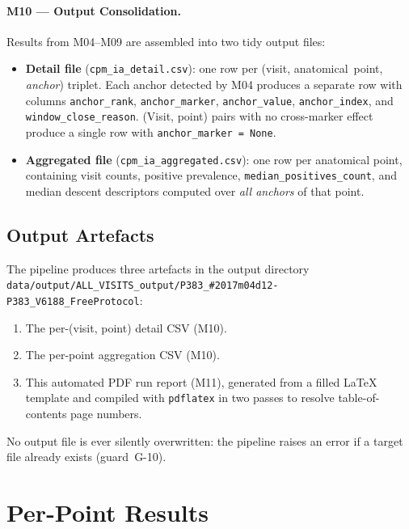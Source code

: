 \documentclass[a4paper,11pt]{article}
\begin{document}
\paragraph{M10 --- Output Consolidation.}
Results from M04--M09 are assembled into two tidy output files:
\begin{itemize}
  \item \textbf{Detail file} (\texttt{cpm\_ia\_detail.csv}): one row per
        (visit, anatomical~point, \emph{anchor}) triplet. Each anchor detected by M04
        produces a separate row with columns \texttt{anchor\_rank},
        \texttt{anchor\_marker}, \texttt{anchor\_value}, \texttt{anchor\_index},
        and \texttt{window\_close\_reason}.
        (Visit, point) pairs with no cross-marker effect produce a single row with
        \texttt{anchor\_marker = None}.
  \item \textbf{Aggregated file} (\texttt{cpm\_ia\_aggregated.csv}): one row per
        anatomical point, containing visit counts, positive prevalence,
        \texttt{median\_positives\_count}, and median descent descriptors computed over
        \emph{all anchors} of that point.
\end{itemize}

\subsection{Output Artefacts}

The pipeline produces three artefacts in the output directory \texttt{data/output/ALL\_VISITS\_output/P383\_\#2017m04d12-P383\_V6188\_FreeProtocol}:
\begin{enumerate}
  \item The per-(visit, point) detail CSV (M10).
  \item The per-point aggregation CSV (M10).
  \item This automated PDF run report (M11), generated from a filled \LaTeX{} template
        and compiled with \texttt{pdflatex} in two passes to resolve table-of-contents
        page numbers.
\end{enumerate}
No output file is ever silently overwritten: the pipeline raises an error if a target
file already exists (guard~G-10).

\section{Per-Point Results}
\end{document}
